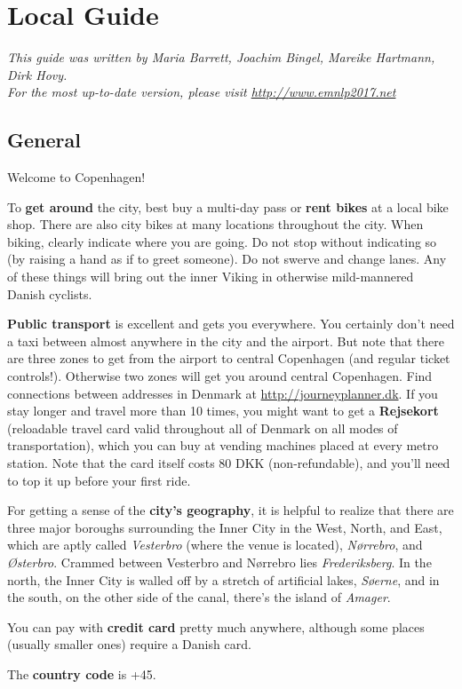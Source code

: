 

\chapter{Local Guide}


\emph{This guide was written by Maria Barrett, Joachim Bingel, Mareike Hartmann, Dirk Hovy.\\
\noindent For the most up-to-date version, please visit
  \url{http://www.emnlp2017.net}}
  



\section{General}
Welcome to Copenhagen!

To \textbf{get around} the city, best buy a multi-day pass or \textbf{rent bikes} at a local bike shop. There are also city bikes at many locations throughout the city. When biking, clearly indicate where you are going. Do not stop without indicating so (by raising a hand as if to greet someone). Do not swerve and change lanes. Any of these things will bring out the inner Viking in otherwise mild-mannered Danish cyclists.

\textbf{Public transport} is excellent and gets you everywhere. You certainly don't need a taxi between almost anywhere in the city and the airport. But note that there are three zones to get from the airport to central Copenhagen (and regular ticket controls!). Otherwise two zones will get you around central Copenhagen. Find connections between addresses in Denmark at \url{http://journeyplanner.dk}. If you stay longer and travel more than 10 times, you might want to get a \textbf{Rejsekort} (reloadable travel card valid throughout all of Denmark on all modes of transportation), which you can buy at vending machines placed at every metro station. Note that the card itself costs 80 DKK (non-refundable), and you’ll need to top it up before your first ride.
\par
For getting a sense of the \textbf{city’s geography}, it is helpful to realize that there are three major boroughs surrounding the Inner City in the West, North, and East, which are aptly called \textit{Vesterbro} (where the venue is located), \textit{Nørrebro}, and \textit{Østerbro}. Crammed between Vesterbro and Nørrebro lies \textit{Frederiksberg}. In the north, the Inner City is walled off by a stretch of artificial lakes, \textit{Søerne}, and in the south, on the other side of the canal, there’s the island of \textit{Amager}. 
\par
You can pay with \textbf{credit card} pretty much anywhere, although some places (usually smaller ones) require a Danish card.
\par
The \textbf{country code} is +45.


